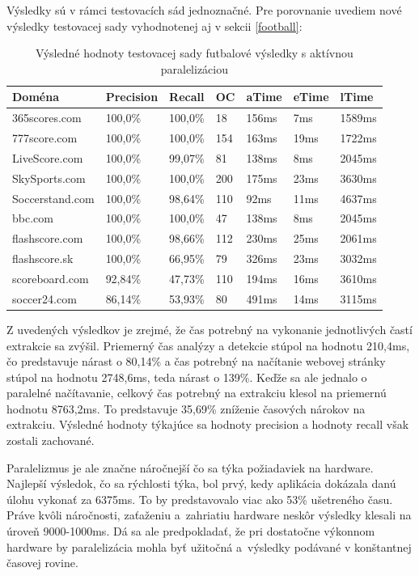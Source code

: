 Výsledky sú v rámci testovacích sád jednoznačné. Pre porovnanie uvediem nové výsledky testovacej sady  vyhodnotenej aj v sekcii \ref{football}:

\begin{table}[hbt]
\caption{Výsledné hodnoty testovacej sady futbalové výsledky s aktívnou paralelizáciou}
\centering
\begin{tabular}{|l|l|l|l|l|l|l|}
\hline
\textbf{Doména}          & \textbf{Precision} & \textbf{Recall}  & \textbf{OC}  & \textbf{aTime} & \textbf{eTime} & \textbf{lTime}  \\ \hline
365scores.com   & 100,0\%   & 100,0\% & 18  & 156ms & 7ms   & 1589ms  \\ \hline
777score.com    & 100,0\%   & 100,0\% & 154 & 163ms  & 19ms  & 1722ms \\ \hline
LiveScore.com   & 100,0\%   & 99,07\% & 81  & 138ms  & 8ms   & 2045ms  \\ \hline
SkySports.com   & 100,0\%   & 100,0\% & 200 & 175ms & 23ms  & 3630ms  \\ \hline
Soccerstand.com & 100,0\%   & 98,64\% & 110 & 92ms  & 11ms  & 4637ms \\ \hline
bbc.com         & 100,0\%   & 100,0\% & 47  &  138ms  & 8ms  & 2045ms \\ \hline
flashscore.com  & 100,0\%   & 98,66\% & 112 & 230ms  & 25ms   & 2061ms \\ \hline
flashscore.sk   & 100,0\%   & 66,95\% & 79  & 326ms & 23ms   & 3032ms \\ \hline
scoreboard.com  & 92,84\%   & 47,73\% & 110 & 194ms & 16ms  & 3610ms \\ \hline
soccer24.com    & 86,14\%   & 53,93\% & 80  & 491ms & 14ms  & 3115ms \\ \hline
\end{tabular}
\end{table}

Z uvedených výsledkov je zrejmé, že čas potrebný na vykonanie jednotlivých častí extrakcie sa zvýšil. Priemerný čas analýzy a detekcie stúpol na hodnotu 210,4ms, čo predstavuje nárast o 80,14\% a čas potrebný na načítanie webovej stránky stúpol na hodnotu 2748,6ms, teda nárast o 139\%. Keďže sa ale jednalo o paralelné načítavanie, celkový čas potrebný na extrakciu klesol na priemernú hodnotu 8763,2ms. To predstavuje 35,69\% zníženie časových nárokov na extrakciu. Výsledné hodnoty týkajúce sa hodnoty precision a hodnoty recall však zostali zachované.

Paralelizmus je ale značne náročnejší čo sa týka požiadaviek na hardware. Najlepší výsledok, čo sa rýchlosti týka, bol prvý, kedy aplikácia dokázala danú úlohu vykonať za 6375ms. To by predstavovalo viac ako 53\% ušetreného času. Práve kvôli náročnosti, zaťaženiu a~zahriatiu hardware neskôr výsledky klesali na úroveň 9000-1000ms. Dá sa ale predpokladať, že pri dostatočne výkonnom hardware by paralelizácia mohla byť užitočná a~výsledky podávané v konštantnej časovej rovine.


